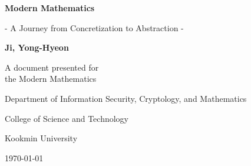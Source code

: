 \begin{titlepage}
    \centering
    
    \vspace*{1cm}
    
    \Huge\textsf{\textbf{Modern Mathematics}}
    
    \vspace{0.5cm}
    \LARGE\textsf{- A Journey from Concretization to Abstraction -}
    
    \vspace{1.5cm}
    \textbf{Ji, Yong-Hyeon}

    \vfill
    A document presented for\\
    the Modern Mathematics
    
    \vspace{0.8cm}
    {\large\textsf{Department of Information Security, Cryptology, and Mathematics}\par}
    {\large\textsf{College of Science and Technology}\par}
    {\large\textsf{Kookmin University}\par}
    \vspace{.25in}
    {\large \textsf{\today}\par}
    
\end{titlepage}

